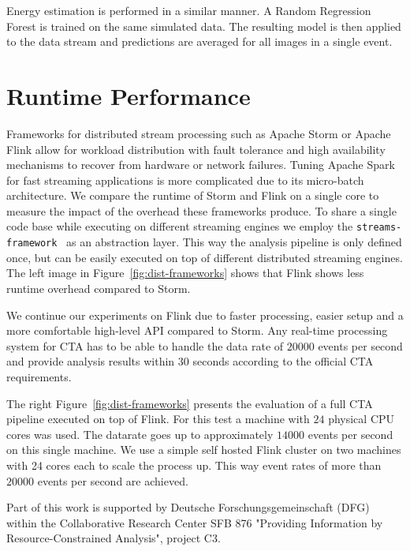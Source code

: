\documentclass[11pt,twoside]{article}
\begin{document}
Energy estimation is performed in a similar manner. A Random Regression Forest is trained on the same simulated data.
The resulting model is then applied to the data stream and predictions are averaged for all images in a single event.



\section{Runtime Performance}


Frameworks for distributed stream processing such as Apache Storm \citep{storm} or Apache Flink \citep{flink}
allow for workload distribution with fault tolerance and high availability mechanisms to recover from hardware or network failures.
Tuning Apache Spark for fast streaming applications is more complicated due to its micro-batch architecture.
We compare the runtime of Storm and Flink on a single core to measure the impact of the overhead these frameworks produce.
To share a single code base while executing on different streaming engines we employ the \texttt{streams-framework}~\citep{streams}
as an abstraction layer.
This way the analysis pipeline is only defined once, but can be easily executed on top of different distributed streaming engines.
The left image in Figure~\ref{fig:dist-frameworks} shows that Flink shows less runtime overhead compared to Storm.

We continue our experiments on Flink due to faster processing, easier setup and a more comfortable high-level API compared to Storm.
Any real-time processing system for CTA has to be able to handle the data rate of $20000$ events per second and provide analysis results
within 30 seconds according to the official CTA requirements.

The right Figure~\ref{fig:dist-frameworks} presents the evaluation of a full CTA pipeline executed on top of Flink.
For this test a machine with $24$ physical CPU cores was used.
The datarate goes up to approximately $14000$ events per second on this single machine.
We use a simple self hosted Flink cluster on two machines with 24 cores each to scale the process up.
This way event rates of more than $20 000$ events per second are achieved.


\acknowledgements Part of this work is supported by Deutsche Forschungsgemeinschaft (DFG) within the Collaborative Research Center SFB 876 "Providing Information by Resource-Constrained Analysis", project C3.


\end{document}
